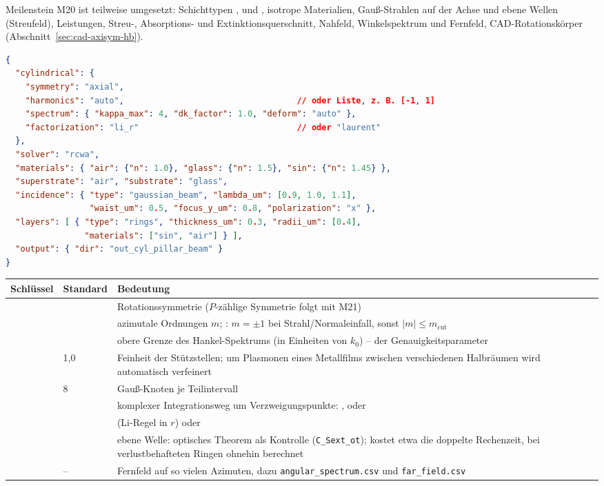 \begin{achtung}[Stand]
Meilenstein M20 ist teilweise umgesetzt: Schichttypen ,  und ,
isotrope Materialien, Gauß-Strahlen auf der Achse und ebene Wellen (Streufeld), Leistungen, Streu-, Absorptions- und
Extinktionsquerschnitt, Nahfeld, Winkelspektrum und Fernfeld, CAD-Rotationskörper
(Abschnitt~\ref{sec:cad-axisym-hb}).
\end{achtung}

\begin{lstlisting}[language=json]
{
  "cylindrical": {
    "symmetry": "axial",
    "harmonics": "auto",                                   // oder Liste, z. B. [-1, 1]
    "spectrum": { "kappa_max": 4, "dk_factor": 1.0, "deform": "auto" },
    "factorization": "li_r"                                // oder "laurent"
  },
  "solver": "rcwa",
  "materials": { "air": {"n": 1.0}, "glass": {"n": 1.5}, "sin": {"n": 1.45} },
  "superstrate": "air", "substrate": "glass",
  "incidence": { "type": "gaussian_beam", "lambda_um": [0.9, 1.0, 1.1],
                 "waist_um": 0.5, "focus_y_um": 0.8, "polarization": "x" },
  "layers": [ { "type": "rings", "thickness_um": 0.3, "radii_um": [0.4],
                "materials": ["sin", "air"] } ],
  "output": { "dir": "out_cyl_pillar_beam" }
}
\end{lstlisting}
\begin{center}
\small
\begin{tabularx}{\linewidth}{llY}
\toprule
Schlüssel & Standard & Bedeutung \\
\midrule
{} &  & Rotationssymmetrie ($P$-zählige Symmetrie folgt mit M21) \\
 &  & azimutale Ordnungen $m$; : $m=\pm1$ bei Strahl/Normaleinfall, sonst
$|m|\le m_{\text{cut}}$ \\
 & & obere Grenze des Hankel-Spektrums (in Einheiten von $k_0$) -- der Genauigkeitsparameter \\
 & 1,0 & Feinheit der Stützstellen; um Plasmonen eines Metallfilms zwischen verschiedenen Halbräumen wird automatisch verfeinert \\
 & 8 & Gauß-Knoten je Teilintervall \\
 &  & komplexer Integrationsweg um Verzweigungspunkte: ,  oder
 \\
 &  &  (Li-Regel in $r$) oder  \\
 &  & ebene Welle: optisches Theorem als Kontrolle (\texttt{C\_Sext\_ot}); kostet
etwa die doppelte Rechenzeit, bei verlustbehafteten Ringen ohnehin berechnet \\
 & -- & Fernfeld auf so vielen Azimuten, dazu \texttt{angular\_spectrum.csv} und
\texttt{far\_field.csv} \\
\bottomrule
\end{tabularx}
\end{center}

